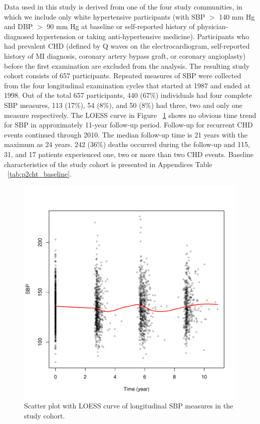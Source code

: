 Data used in this study is derived from one of the four study communities, in which we include only white hypertensive participants (with SBP $>$ 140 mm Hg and DBP $>$ 90 mm Hg at baseline or self-reported history of physician-diagnosed hypertension or taking anti-hypertensive medicine). Participants who had prevalent CHD (defined by Q waves on the electrocardiogram, self-reported history of MI diagnosis, coronary artery bypass graft, or coronary angioplasty) before the first examination are excluded from the analysis. The resulting study cohort consists of 657 participants. Repeated measures of SBP were collected from the four longitudinal examination cycles that started at 1987 and ended at 1998. Out of the total 657 participants, 440 (67\%) individuals had four complete SBP measures, 113 (17\%), 54 (8\%), and 50 (8\%) had three, two and only one measure respectively. The LOESS curve in Figure ~\ref{fig:p2_sbp_loess} shows no obvious time trend for SBP in approximately 11-year follow-up period. Follow-up for recurrent CHD events continued through 2010. The median follow-up time is 21 years with the maximum as 24 years. 242 (36\%) deaths occurred during the follow-up and 115, 31, and 17 patients experienced one, two or more than two CHD events. Baseline characteristics of the study cohort is presented in Appendices Table ~\ref{tab:p2cht_baseline}.

\begin{figure}[H]
\centering
\includegraphics[scale=0.6]{SBP_loess.pdf}
\caption{Scatter plot with LOESS curve of longitudinal SBP measures in the study cohort.}
\label{fig:p2_sbp_loess}
\end{figure}

